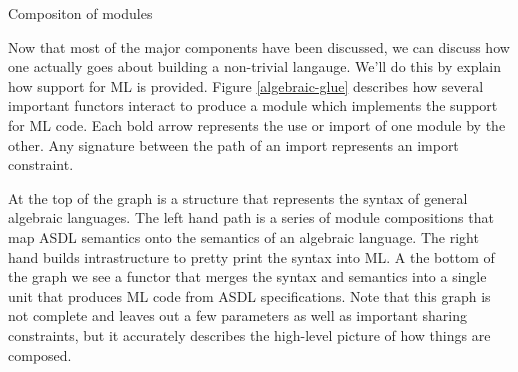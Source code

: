 \begin{myfigure}
\caption{Compositon of modules \label{algebraic-glue}}
\end{myfigure}
Now that most of the major components have been discussed, we can discuss
how one actually goes about building a non-trivial langauge. We'll do this
by explain how support for ML is provided. Figure \ref{algebraic-glue}
describes how several important functors interact to produce a module which
implements the support for ML code. Each bold arrow represents the use or
import of one module by the other. Any signature between the path of an
import represents an import constraint. 

At the top of the graph is a structure that represents the syntax of general
algebraic languages. The left hand path is a series of module compositions
that map ASDL semantics onto the semantics of an algebraic language. The
right hand builds intrastructure to pretty print the syntax into ML. A the
bottom of the graph we see a functor that merges the syntax and semantics
into a single unit that produces ML code from ASDL specifications. Note that
this graph is not complete and leaves out a few parameters as well as
important sharing constraints, but it accurately describes the high-level
picture of how things are composed.
